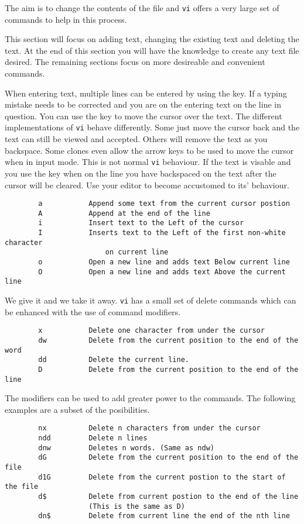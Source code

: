         The aim is to change the contents of the file and {\tt vi} offers a
very large set of commands to help in this process. 

This section will focus on adding text, changing the existing text
and deleting the text. At the end of this section you will have the 
knowledge to create any text file desired. The remaining sections
focus on more desireable and convenient commands.

        When entering text, multiple lines can be entered by using the
 key. If a typing mistake needs to be corrected and you are on the
entering text on the line in question. You can use the  key to 
move the cursor over the text. The different implementations of {\tt vi} 
behave differently. Some just move the cursor back and the text can still
be viewed and accepted. Others will remove the text as you backspace. Some
clones even allow the arrow keys to be used to move the cursor when
in input mode. This is not normal {\tt vi} behaviour. If the text is visable
and you use the  key when on the line you have backspaced on the
text after the cursor will be cleared. Use your editor to become accustomed
to its' behaviour.

\begin{verbatim}
        a           Append some text from the current cursor postion
        A           Append at the end of the line
        i           Insert text to the Left of the cursor
        I           Inserts text to the Left of the first non-white character
                        on current line
        o           Open a new line and adds text Below current line
        O           Open a new line and adds text Above the current line
\end{verbatim}

        We give it and we take it away. {\tt vi} has a small set of delete
commands which can be enhanced with the use of command modifiers.

\begin{verbatim}
        x           Delete one character from under the cursor
        dw          Delete from the current position to the end of the word
        dd          Delete the current line.
        D           Delete from the current position to the end of the line
\end{verbatim}

The modifiers can be used to add greater power to the commands.
The following examples are a subset of the posibilities.
\begin{verbatim}
        nx          Delete n characters from under the cursor
        ndd         Delete n lines
        dnw         Deletes n words. (Same as ndw)
        dG          Delete from the current position to the end of the file
        d1G         Delete from the current postion to the start of the file
        d$          Delete from current postion to the end of the line
                    (This is the same as D)
        dn$         Delete from current line the end of the nth line
\end{verbatim}

